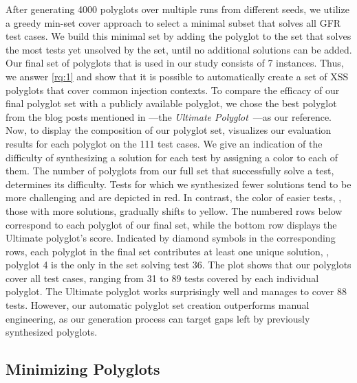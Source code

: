 After generating \num{4000} polyglots over multiple runs from different seeds, we utilize a greedy min-set cover approach to select a minimal subset that solves all GFR test cases.
We build this minimal set by adding the polyglot to the set that solves the most tests yet unsolved by the set, until no additional solutions can be added.
Our final set of polyglots that is used in our study consists of 7 instances.
Thus, we answer \ref{rq:1} and show that it is possible to automatically create a set of XSS polyglots that cover common injection contexts.
To compare the efficacy of our final polyglot set with a publicly available polyglot, we chose the best polyglot from the blog posts mentioned in ---the \emph{Ultimate \xss{} Polyglot}~\cite{ultimate-polyglot}---as our reference. 
Now, to display the composition of our polyglot set,  visualizes our evaluation results for each polyglot on the \num{111} test cases.
We give an indication of the difficulty of synthesizing a solution for each test by assigning a color to each of them. 
The number of polyglots from our full set that successfully solve a test, determines its difficulty.
Tests for which we synthesized fewer solutions tend to be more challenging and are depicted in red.
In contrast, the color of easier tests, \ie, those with more solutions, gradually shifts to yellow.
The numbered rows below correspond to each polyglot of our final set, while the bottom row displays the Ultimate polyglot's score.
Indicated by diamond symbols in the corresponding rows, each polyglot in the final set contributes at least one unique solution, \eg, polyglot \num{4} is the only in the set solving test \num{36}.
The plot shows that our polyglots cover all test cases, ranging from \num{31} to \num{89} tests covered by each individual polyglot.
The Ultimate polyglot works surprisingly well and manages to cover \num{88} tests.
However, our automatic polyglot set creation outperforms manual engineering, as our generation process can target gaps left by previously synthesized polyglots.

\subsection{Minimizing Polyglots}%
\label{sec:polyglot-minimization}


